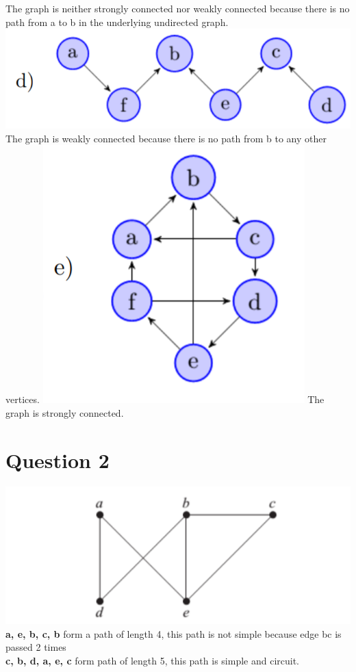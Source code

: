 \documentclass{article}
\begin{document}
\newline
The graph is neither strongly connected nor weakly connected because there is no path from a to b in the underlying undirected graph.
\newline
\includegraphics[]{Question 1/connectivity_1.d.png}
\newline
The graph is weakly connected because there is no path from b to any other vertices.
\newline
\includegraphics[]{Question 1/connectivity_1.e.png}
\newline
The graph is strongly connected.
\newline

\section*{Question 2}
\includegraphics[]{Question 2/connectivity_2.png}
\newline
\textbf{a, e, b, c, b} form a path of length 4, this path is not simple because edge bc is passed 2 times\\
\textbf{c, b, d, a, e, c} form path of length 5, this path is simple and circuit.
\end{document}
